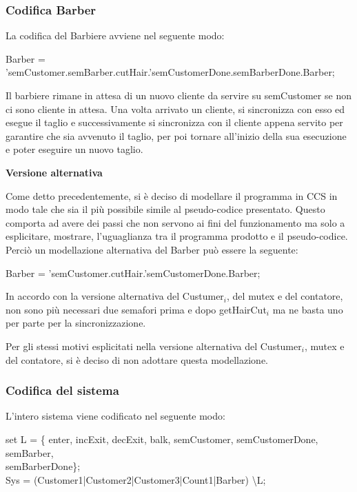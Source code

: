 \subsubsection{Codifica Barber}

La codifica del Barbiere avviene nel seguente modo:

\textsf{Barber = 'semCustomer.semBarber.cutHair.'semCustomerDone.semBarberDone.Barber;}

Il barbiere rimane in attesa di un nuovo cliente da servire su \textsf{semCustomer} se non ci sono cliente in attesa. Una volta arrivato un cliente, si sincronizza con esso ed esegue il taglio e successivamente si sincronizza con il cliente appena servito per garantire che sia avvenuto il taglio, per poi tornare all'inizio della sua esecuzione e poter eseguire un nuovo taglio.

\textbf{Versione alternativa}

Come detto precedentemente, si è deciso di modellare il programma in CCS in modo tale che sia il più possibile simile al pseudo-codice presentato. Questo comporta ad avere dei passi che non servono ai fini del funzionamento ma solo a esplicitare, mostrare, l'uguaglianza tra il programma prodotto e il pseudo-codice.
Perciò un modellazione alternativa del \textsf{Barber} può essere la seguente:

\textsf{Barber = 'semCustomer.cutHair.'semCustomerDone.Barber;}

In accordo con la versione alternativa del \textsf{Custumer$_{i}$}, del \textsf{mutex} e del contatore, non sono più necessari due semafori prima e dopo getHairCut$_{i}$ ma ne basta uno per parte per la sincronizzazione.

Per gli stessi motivi esplicitati nella versione alternativa del \textsf{Custumer$_{i}$}, \textsf{mutex} e del contatore, si è deciso di non adottare questa modellazione. 

\subsubsection{Codifica del sistema}

L'intero sistema viene codificato nel seguente modo:

\textsf{set L = \{ enter, incExit, decExit, balk, semCustomer, semCustomerDone, semBarber,\\ semBarberDone\};}\\
\textsf{Sys = (Customer1|Customer2|Customer3|Count1|Barber) \textbackslash L;}

